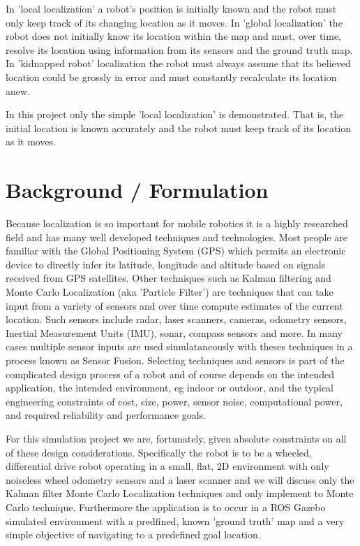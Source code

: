 \documentclass[10pt,journal,compsoc]{IEEEtran}
\begin{document}
In 'local localization' a robot's position is initially known and the robot must only keep track of its changing location as it moves. In 'global localization' the robot does not initially know its location within the map and must, over time, resolve its location using information from its sensors and the ground truth map. In 'kidnapped robot' localization the robot must always assume that its believed location could be grossly in error and must constantly recalculate its location anew. \hfill \vspace{\baselineskip}

In this project only the simple 'local localization' is demonstrated. That is, the initial location is known accurately and the robot must keep track of its location as it moves.

\section{Background / Formulation}
Because localization is so important for mobile robotics it is a highly researched field and has many well developed techniques and technologies. Most people are familiar with the Global Positioning System (GPS) which permits an electronic device to directly infer its latitude, longitude and altitude based on signals received from GPS satellites. Other techniques such as Kalman filtering and Monte Carlo Localization (aka 'Particle Filter') are techniques that can take input from a variety of sensors and over time compute estimates of the current location. Such sensors include radar, laser scanners, cameras, odometry sensors, Inertial Measurement Units (IMU), sonar, compass sensors and more. In many cases multiple sensor inputs are used simulataneously with theses techniques in a process known as Sensor Fusion. Selecting techniques and sensors is part of the complicated design process of a robot and of course depends on the intended application, the intended environment, eg indoor or outdoor, and the typical engineering constraints of cost, size, power, sensor noise, computational power, and required reliability and performance goals.  \hfill \vspace{\baselineskip}

For this simulation project we are, fortunately, given absolute constraints on all of these design considerations. Specifically the robot is to be a wheeled, differential drive robot operating in a small, flat, 2D environment with only noiseless wheel odometry sensors and a laser scanner and we will discuss only the Kalman filter Monte Carlo Localization techniques and only implement to Monte Carlo technique. Furthermore the application is to occur in a ROS Gazebo simulated environment with a predfined, known 'ground truth' map and a very simple objective of navigating to a predefined goal location.  \hfill \vspace{\baselineskip}
\end{document}
